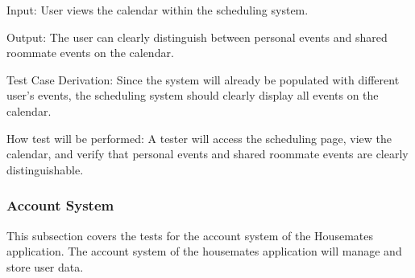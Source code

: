 \documentclass[12pt, titlepage]{article}
\begin{document}
\begin{enumerate}
Input: User views the calendar within the scheduling system.
					
Output: The user can clearly distinguish between personal events and shared roommate events on the calendar.

Test Case Derivation: Since the system will already be populated with different user's events, the scheduling system should clearly display all events on the calendar.

How test will be performed: A tester will access the scheduling page, view the calendar, and verify that personal events and shared roommate events are clearly distinguishable.

\end{enumerate}

\subsubsection{Account System}

This subsection covers the tests for the account system of the Housemates application. The account system of the housemates application will manage and store user data.
\end{document}
